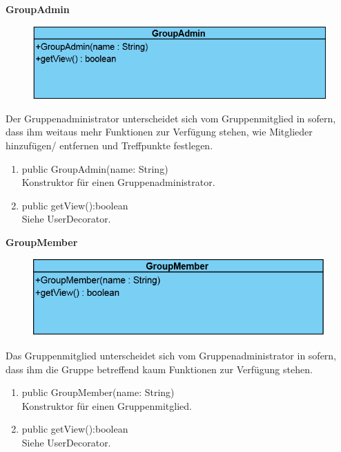 \textbf{GroupAdmin}
\begin{figure}[H]
	\includegraphics[scale = .5]{res/umlClasses/GroupAdmin.png}
	\centering
\end{figure}
Der Gruppenadministrator unterscheidet sich vom Gruppenmitglied in sofern, dass ihm weitaus mehr Funktionen zur Verfügung stehen, wie Mitglieder hinzufügen/ entfernen und Treffpunkte festlegen.
\begin{enumerate}
	\item public GroupAdmin(name: String)\\
		Konstruktor für einen Gruppenadministrator.
	\item public getView():boolean\\
		Siehe UserDecorator.
\end{enumerate}

\textbf{GroupMember}
\begin{figure}[H]
	\includegraphics[scale = .5]{res/umlClasses/GroupMember.png}
	\centering
\end{figure}
Das Gruppenmitglied unterscheidet sich vom Gruppenadministrator in sofern, dass ihm die Gruppe betreffend kaum Funktionen zur Verfügung stehen.  
\begin{enumerate}
	\item public GroupMember(name: String)\\
		Konstruktor für einen Gruppenmitglied.
	\item public getView():boolean\\
		Siehe UserDecorator.
\end{enumerate}

